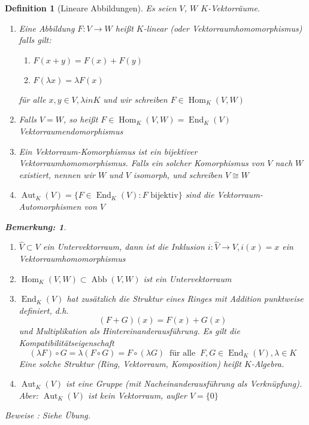 \documentclass{report}
\newcommand{\IN}[1]{\index{#1|BH}}
\newcommand{\lb}{\lambda}
\DeclareMathOperator{\abb}{Abb}
\DeclareMathOperator{\Hom}{Hom}
\DeclareMathOperator{\End}{End}
\DeclareMathOperator{\Aut}{Aut}
\theoremstyle{customrem}
\newtheorem*{bem}{Bemerkung:}
\theoremstyle{customdef}
\newtheorem{definition}{Definition}[chapter]
\begin{document}
	\begin{definition}[Lineare Abbildungen]
		\IN{Lineare!Abbildungen}
		Es seien $V$, $W$ $K$-Vektorräume.
		\begin{enumerate}
			\item Eine Abbildung $F : V \to W$ heißt $K$-linear (oder Vektorraumhomomorphismus) falls gilt:
			\begin{enumerate}[leftmargin=5cm]
				\item $F(x + y) = F(x) + F(y)$
				\item $F(\lb x) = \lb F(x)$
			\end{enumerate}
			für alle $x, y \in V, \lb in K$ und wir schreiben $F \in \Hom_K(V, W)$
			
			\item Falls $V = W$, so heißt $F \in \Hom_K(V, W) = \End_K(V)$ Vektorraumendomorphismus
			\item Ein Vektorraum-Komorphismus ist ein bijektiver Vektorraumhomomorphismus. Falls ein solcher Komorphismus von $V$ nach $W$ existiert, nennen wir $W$ und $V$ isomorph, und schreiben $V \cong W$
			\item $\Aut_K(V) = \{F \in \End_K(V) : F \text{ bijektiv}\}$ sind die Vektorraum-Automorphismen von $V$
		\end{enumerate}
		\vspace{.1cm}
		\begin{bem}$ $
			\begin{enumerate}
				\item $\hat{V} \subset V$ ein Untervektorraum, dann ist die Inklusion $i : \hat{V} \to V, i(x) = x$ ein Vektorraumhomomorphismus
				\item $\Hom_K(V, W) \subset \abb(V, W)$ ist ein Untervektorraum
				\item $\End_K(V)$ hat zusätzlich die Struktur eines Ringes mit Addition punktweise definiert, d.h. $$(F + G)(x) = F(x) + G(x)$$ und Multiplikation als Hintereinanderausführung.
				Es gilt die Kompatibilitätseigenschaft
				$$(\lb F) \circ G = \lb (F \circ G) = F \circ (\lb G)\ \text{ für alle }\ F, G \in \End_K(V), \lb \in K$$
				Eine solche Struktur (Ring, Vektorraum, Komposition) heißt $K$-Algebra.
				
				\item $\Aut_K(V)$ ist eine Gruppe (mit Nacheinanderausführung als Verknüpfung). Aber: $\Aut_K(V)$ ist kein Vektorraum, außer $V = \{0\}$
			\end{enumerate}
		\end{bem}
		Beweise : Siehe Übung.\\
		

\end{definition}
\end{document}
